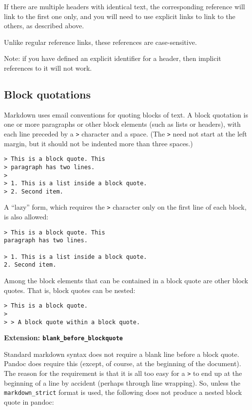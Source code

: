 \documentclass[]{article}
\begin{document}
If there are multiple headers with identical text, the corresponding
reference will link to the first one only, and you will need to use
explicit links to link to the others, as described above.

Unlike regular reference links, these references are case-sensitive.

Note: if you have defined an explicit identifier for a header, then
implicit references to it will not work.

\subsection{Block quotations}

Markdown uses email conventions for quoting blocks of text. A block
quotation is one or more paragraphs or other block elements (such as
lists or headers), with each line preceded by a \texttt{\textgreater{}}
character and a space. (The \texttt{\textgreater{}} need not start at
the left margin, but it should not be indented more than three spaces.)

\begin{verbatim}
> This is a block quote. This
> paragraph has two lines.
>
> 1. This is a list inside a block quote.
> 2. Second item.
\end{verbatim}

A ``lazy'' form, which requires the \texttt{\textgreater{}} character
only on the first line of each block, is also allowed:

\begin{verbatim}
> This is a block quote. This
paragraph has two lines.

> 1. This is a list inside a block quote.
2. Second item.
\end{verbatim}

Among the block elements that can be contained in a block quote are
other block quotes. That is, block quotes can be nested:

\begin{verbatim}
> This is a block quote.
>
> > A block quote within a block quote.
\end{verbatim}

\textbf{Extension: \texttt{blank\_before\_blockquote}}

Standard markdown syntax does not require a blank line before a block
quote. Pandoc does require this (except, of course, at the beginning of
the document). The reason for the requirement is that it is all too easy
for a \texttt{\textgreater{}} to end up at the beginning of a line by
accident (perhaps through line wrapping). So, unless the
\texttt{markdown\_strict} format is used, the following does not produce
a nested block quote in pandoc:
\end{document}
